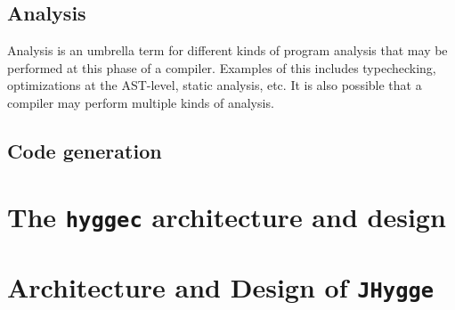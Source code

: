 \subsection{Analysis}

Analysis is an umbrella term for different kinds of program analysis that may be performed at this phase of a compiler. Examples of this includes typechecking, optimizations at the AST-level,
static analysis, etc. It is also possible that a compiler may perform multiple kinds of analysis.

\subsection{Code generation}

\section{The \texttt{hyggec} architecture and design}

\section{Architecture and Design of \texttt{JHygge}}

